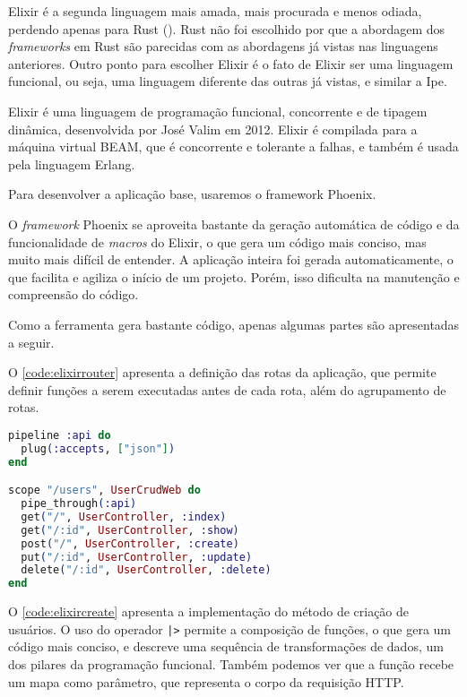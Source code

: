 Elixir é a segunda linguagem mais amada, mais procurada e menos odiada, perdendo
apenas para Rust (\textcite{stackoverflowsurvey}). Rust não foi escolhido por que
a abordagem dos \textit{frameworks} em Rust são parecidas com as abordagens já
vistas nas linguagens anteriores. Outro ponto para escolher Elixir é o fato de
Elixir ser uma linguagem funcional, ou seja, uma linguagem diferente das outras
já vistas, e similar a Ipe.

Elixir é uma linguagem de programação funcional, concorrente e de tipagem dinâmica,
desenvolvida por José Valim em 2012. Elixir é compilada para a máquina virtual
BEAM, que é concorrente e tolerante a falhas, e também é usada pela linguagem
Erlang.

Para desenvolver a aplicação base, usaremos o framework Phoenix.

O \textit{framework} Phoenix se aproveita bastante da geração automática de código
e da funcionalidade de \textit{macros} do Elixir, o que gera um código mais conciso,
mas muito mais difícil de entender. A aplicação inteira foi gerada automaticamente,
o que facilita e agiliza o início de um projeto. Porém, isso dificulta na manutenção
e compreensão do código.

Como a ferramenta gera bastante código, apenas algumas partes são apresentadas a
seguir.

O \autoref{code:elixirrouter} apresenta a definição das rotas da aplicação, que
permite definir funções a serem executadas antes de cada rota, além do agrupamento
de rotas.


\begin{lstlisting}[language=Elixir,label={code:elixirrouter},caption={Definição das rotas da aplicação em Elixir com Phoenix}]
pipeline :api do
  plug(:accepts, ["json"])
end

scope "/users", UserCrudWeb do
  pipe_through(:api)
  get("/", UserController, :index)
  get("/:id", UserController, :show)
  post("/", UserController, :create)
  put("/:id", UserController, :update)
  delete("/:id", UserController, :delete)
end
\end{lstlisting}

O \autoref{code:elixircreate} apresenta a implementação do método de criação de
usuários. O uso do operador \texttt{|>} permite a composição de funções, o que
gera um código mais conciso, e descreve uma sequência de transformações de dados,
um dos pilares da programação funcional. Também podemos ver que a função recebe
um mapa como parâmetro, que representa o corpo da requisição HTTP.

